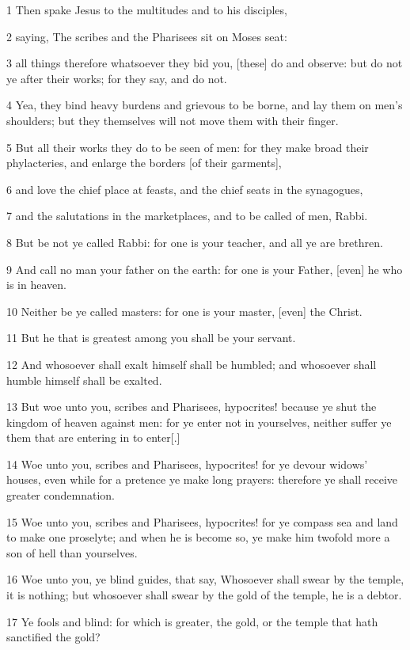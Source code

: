 \par 1 Then spake Jesus to the multitudes and to his disciples,
\par 2 saying, The scribes and the Pharisees sit on Moses seat:
\par 3 all things therefore whatsoever they bid you, [these] do and observe: but do not ye after their works; for they say, and do not.
\par 4 Yea, they bind heavy burdens and grievous to be borne, and lay them on men's shoulders; but they themselves will not move them with their finger.
\par 5 But all their works they do to be seen of men: for they make broad their phylacteries, and enlarge the borders [of their garments],
\par 6 and love the chief place at feasts, and the chief seats in the synagogues,
\par 7 and the salutations in the marketplaces, and to be called of men, Rabbi.
\par 8 But be not ye called Rabbi: for one is your teacher, and all ye are brethren.
\par 9 And call no man your father on the earth: for one is your Father, [even] he who is in heaven.
\par 10 Neither be ye called masters: for one is your master, [even] the Christ.
\par 11 But he that is greatest among you shall be your servant.
\par 12 And whosoever shall exalt himself shall be humbled; and whosoever shall humble himself shall be exalted.
\par 13 But woe unto you, scribes and Pharisees, hypocrites! because ye shut the kingdom of heaven against men: for ye enter not in yourselves, neither suffer ye them that are entering in to enter[.]
\par 14 Woe unto you, scribes and Pharisees, hypocrites! for ye devour widows' houses, even while for a pretence ye make long prayers: therefore ye shall receive greater condemnation.
\par 15 Woe unto you, scribes and Pharisees, hypocrites! for ye compass sea and land to make one proselyte; and when he is become so, ye make him twofold more a son of hell than yourselves.
\par 16 Woe unto you, ye blind guides, that say, Whosoever shall swear by the temple, it is nothing; but whosoever shall swear by the gold of the temple, he is a debtor.
\par 17 Ye fools and blind: for which is greater, the gold, or the temple that hath sanctified the gold?
